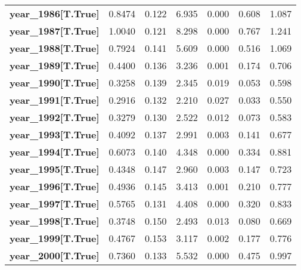 \begin{center}
\begin{tabular}{lcccccc}
\textbf{year\_1986[T.True]} &       0.8474  &        0.122     &     6.935  &         0.000        &        0.608    &        1.087     \\
\textbf{year\_1987[T.True]} &       1.0040  &        0.121     &     8.298  &         0.000        &        0.767    &        1.241     \\
\textbf{year\_1988[T.True]} &       0.7924  &        0.141     &     5.609  &         0.000        &        0.516    &        1.069     \\
\textbf{year\_1989[T.True]} &       0.4400  &        0.136     &     3.236  &         0.001        &        0.174    &        0.706     \\
\textbf{year\_1990[T.True]} &       0.3258  &        0.139     &     2.345  &         0.019        &        0.053    &        0.598     \\
\textbf{year\_1991[T.True]} &       0.2916  &        0.132     &     2.210  &         0.027        &        0.033    &        0.550     \\
\textbf{year\_1992[T.True]} &       0.3279  &        0.130     &     2.522  &         0.012        &        0.073    &        0.583     \\
\textbf{year\_1993[T.True]} &       0.4092  &        0.137     &     2.991  &         0.003        &        0.141    &        0.677     \\
\textbf{year\_1994[T.True]} &       0.6073  &        0.140     &     4.348  &         0.000        &        0.334    &        0.881     \\
\textbf{year\_1995[T.True]} &       0.4348  &        0.147     &     2.960  &         0.003        &        0.147    &        0.723     \\
\textbf{year\_1996[T.True]} &       0.4936  &        0.145     &     3.413  &         0.001        &        0.210    &        0.777     \\
\textbf{year\_1997[T.True]} &       0.5765  &        0.131     &     4.408  &         0.000        &        0.320    &        0.833     \\
\textbf{year\_1998[T.True]} &       0.3748  &        0.150     &     2.493  &         0.013        &        0.080    &        0.669     \\
\textbf{year\_1999[T.True]} &       0.4767  &        0.153     &     3.117  &         0.002        &        0.177    &        0.776     \\
\textbf{year\_2000[T.True]} &       0.7360  &        0.133     &     5.532  &         0.000        &        0.475    &        0.997     \\

\end{tabular}
\end{center}

